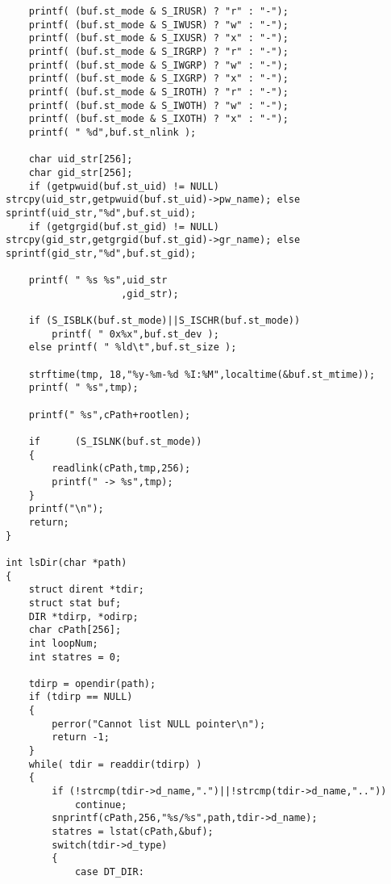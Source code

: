\documentclass[12pt]{article}
\begin{document}
\begin{lstlisting}
    printf( (buf.st_mode & S_IRUSR) ? "r" : "-");
    printf( (buf.st_mode & S_IWUSR) ? "w" : "-");
    printf( (buf.st_mode & S_IXUSR) ? "x" : "-");
    printf( (buf.st_mode & S_IRGRP) ? "r" : "-");
    printf( (buf.st_mode & S_IWGRP) ? "w" : "-");
    printf( (buf.st_mode & S_IXGRP) ? "x" : "-");
    printf( (buf.st_mode & S_IROTH) ? "r" : "-");
    printf( (buf.st_mode & S_IWOTH) ? "w" : "-");
    printf( (buf.st_mode & S_IXOTH) ? "x" : "-");
    printf( " %d",buf.st_nlink );

    char uid_str[256];
    char gid_str[256];
    if (getpwuid(buf.st_uid) != NULL) strcpy(uid_str,getpwuid(buf.st_uid)->pw_name); else sprintf(uid_str,"%d",buf.st_uid);
    if (getgrgid(buf.st_gid) != NULL) strcpy(gid_str,getgrgid(buf.st_gid)->gr_name); else sprintf(gid_str,"%d",buf.st_gid);
    
    printf( " %s %s",uid_str
                    ,gid_str);

    if (S_ISBLK(buf.st_mode)||S_ISCHR(buf.st_mode))
        printf( " 0x%x",buf.st_dev );
    else printf( " %ld\t",buf.st_size );

    strftime(tmp, 18,"%y-%m-%d %I:%M",localtime(&buf.st_mtime));
    printf( " %s",tmp);

    printf(" %s",cPath+rootlen);

    if      (S_ISLNK(buf.st_mode))
    {
        readlink(cPath,tmp,256);
        printf(" -> %s",tmp);
    }
    printf("\n");
    return;
}

int lsDir(char *path)
{
    struct dirent *tdir;
    struct stat buf;
    DIR *tdirp, *odirp;
    char cPath[256];
    int loopNum;
    int statres = 0;

    tdirp = opendir(path);
    if (tdirp == NULL)
    {
        perror("Cannot list NULL pointer\n");
        return -1;
    }     
    while( tdir = readdir(tdirp) )
    {
        if (!strcmp(tdir->d_name,".")||!strcmp(tdir->d_name,".."))
            continue;
        snprintf(cPath,256,"%s/%s",path,tdir->d_name);
        statres = lstat(cPath,&buf);
        switch(tdir->d_type)
        {
            case DT_DIR:
                

\end{lstlisting}
\end{document}
